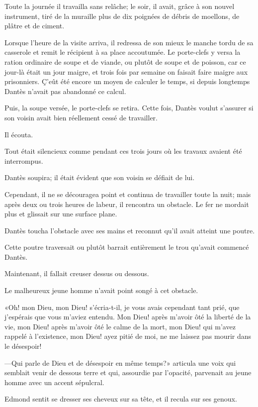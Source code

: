 Toute la journée il travailla sans relâche; le soir, il avait, grâce à son nouvel instrument, tiré de la muraille plus de dix poignées de débris de moellons, de plâtre et de ciment.

Lorsque l'heure de la visite arriva, il redressa de son mieux le manche tordu de sa casserole et remit le récipient à sa place accoutumée. Le porte-clefs y versa la ration ordinaire de soupe et de viande, ou plutôt de soupe et de poisson, car ce jour-là était un jour maigre, et trois fois par semaine on faisait faire maigre aux prisonniers. Ç'eût été encore un moyen de calculer le temps, si depuis longtemps Dantès n'avait pas abandonné ce calcul.

Puis, la soupe versée, le porte-clefs se retira. Cette fois, Dantès voulut s'assurer si son voisin avait bien réellement cessé de travailler.

Il écouta.

Tout était silencieux comme pendant ces trois jours où les travaux avaient été interrompus.

Dantès soupira; il était évident que son voisin se défiait de lui.

Cependant, il ne se découragea point et continua de travailler toute la nuit; mais après deux ou trois heures de labeur, il rencontra un obstacle. Le fer ne mordait plus et glissait sur une surface plane.

Dantès toucha l'obstacle avec ses mains et reconnut qu'il avait atteint une poutre.

Cette poutre traversait ou plutôt barrait entièrement le trou qu'avait commencé Dantès.

Maintenant, il fallait creuser dessus ou dessous.

Le malheureux jeune homme n'avait point songé à cet obstacle.

«Oh! mon Dieu, mon Dieu! s'écria-t-il, je vous avais cependant tant prié, que j'espérais que vous m'aviez entendu. Mon Dieu! après m'avoir ôté la liberté de la vie, mon Dieu! après m'avoir ôté le calme de la mort, mon Dieu! qui m'avez rappelé à l'existence, mon Dieu! ayez pitié de moi, ne me laissez pas mourir dans le désespoir!

—Qui parle de Dieu et de désespoir en même temps?» articula une voix qui semblait venir de dessous terre et qui, assourdie par l'opacité, parvenait au jeune homme avec un accent sépulcral.

Edmond sentit se dresser ses cheveux sur sa tête, et il recula sur ses genoux.

